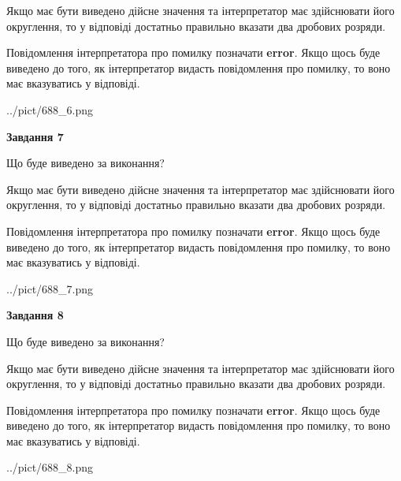 \documentclass[12pt, ukrainian]{article}
\begin{document}
{\begin {Large}
Якщо має бути виведено дійсне значення та інтерпретатор має здійснювати його округлення, 
то у відповіді достатньо правильно вказати два дробових розряди.

Повідомлення інтерпретатора про помилку позначати \textbf{error}.
Якщо щось буде виведено до того, як інтерпретатор видасть повідомлення про помилку, 
то воно має вказуватись у відповіді. \par

\begin{center}
	{../pict/688_6.png}
\end{center}
\newpage

{\begin {center}\textbf{Завдання 7}\end {center}}\par
Що буде виведено за виконання? \par

Якщо має бути виведено дійсне значення та інтерпретатор має здійснювати його округлення, 
то у відповіді достатньо правильно вказати два дробових розряди.

Повідомлення інтерпретатора про помилку позначати \textbf{error}.
Якщо щось буде виведено до того, як інтерпретатор видасть повідомлення про помилку, 
то воно має вказуватись у відповіді. \par

\begin{center}
	{../pict/688_7.png}
\end{center}
\newpage

{\begin {center}\textbf{Завдання 8}\end {center}}\par
Що буде виведено за виконання? \par

Якщо має бути виведено дійсне значення та інтерпретатор має здійснювати його округлення, 
то у відповіді достатньо правильно вказати два дробових розряди.

Повідомлення інтерпретатора про помилку позначати \textbf{error}.
Якщо щось буде виведено до того, як інтерпретатор видасть повідомлення про помилку, 
то воно має вказуватись у відповіді. \par

\begin{center}
	{../pict/688_8.png}
\end{center}
\newpage


\end{Large}}
\end{document}
